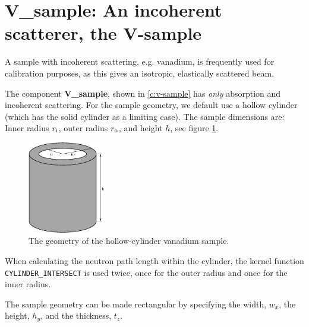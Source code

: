 

\section{V\_sample: An incoherent scatterer, the V-sample}
\label{s:v_sample}


A sample with incoherent scattering, e.g. vanadium, is frequently used for 
calibration purposes, as this gives an isotropic, elastically scattered beam.

The component {\bf V\_sample}, shown in \ref{c:v-sample}
has {\em only} absorption and incoherent scattering.
For the sample geometry, we default use a 
hollow cylinder (which has the solid cylinder as a limiting case).
The sample dimensions are: Inner radius $r_{\rm i}$, 
outer radius $r_{\rm o}$, and height $h$, see figure \ref{f:v-sample}.
\begin{figure}
  \begin{center}
    \includegraphics[width=0.3\textwidth]{figures/vsample.eps}
  \end{center}
\caption{The geometry of the hollow-cylinder vanadium sample.}
\label{f:v-sample}
\end{figure}

When calculating the neutron path length within
the cylinder, the kernel function 
\verb+CYLINDER_INTERSECT+
is used twice, once for the outer radius and once 
for the inner radius.

The sample geometry can be made rectangular by specifying the width, $w_x$, the
height, $h_y$, and the thickness, $t_z$.

